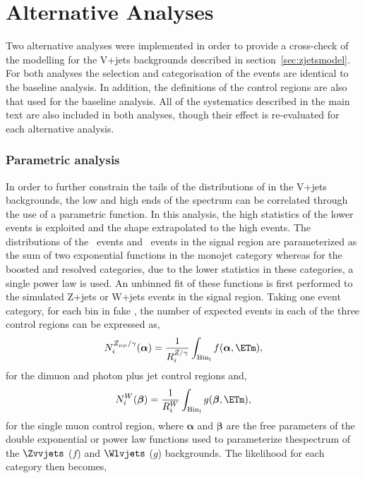 \section{Alternative Analyses}

Two alternative analyses were implemented in order to provide a cross-check of the 
modelling for the V+jets backgrounds described in section~\ref{sec:zjetsmodel}. 
For both analyses the selection and categorisation of the events 
are identical to the baseline analysis. In addition, the definitions of the control regions 
are also that used for the baseline analysis. All of the systematics described in the main text 
are also included in both analyses, though their effect is re-evaluated for each alternative analysis. 

\subsubsection{Parametric analysis}

In order to further constrain the tails of the distributions of \ETm in the V+jets backgrounds, the low and high ends 
of the spectrum can be correlated through the use of a parametric function. In this analysis, the high statistics 
of the lower \ETm events is exploited and the shape extrapolated to the high \ETm events. 
The \ETm distributions of the \Zvvjets~events and \Wlvjets~events in the signal region are parameterized as the sum of two exponential functions in the 
monojet category whereas for the boosted and resolved categories, due to the lower statistics 
in these categories, a single power law is used. An unbinned fit of these functions is first performed to the simulated Z+jets or W+jets events 
in the signal region.
Taking one event category, for each bin in fake \ETm, the number of expected events in each of the three 
control regions can be expressed as, 
\begin{equation}
N^{Z_{\mu\mu}/\gamma }_{i} (\boldsymbol{\alpha})=  \dfrac{1}{R^{Z/\gamma}_{i}} \int_{\mathrm{Bin_i}} f(\boldsymbol{\alpha},\ETm),
\end{equation} 
for the dimuon and photon plus jet control regions and,
\begin{equation}
N^{W}_{i}(\boldsymbol{\beta}) =  \dfrac{1}{R^{W}_{i}} \int_{\mathrm{Bin_i}} g(\boldsymbol{\beta},\ETm),
\end{equation} 
for the single muon control region, where $\boldsymbol{\alpha}$ and $\boldsymbol{\beta}$ are the free parameters 
of the double exponential or power law functions used to parameterize the\ETm spectrum of the 
 $\Zvvjets$ ($f$) and $\Wlvjets$ ($g$) backgrounds.
 The likelihood for each category then becomes,

